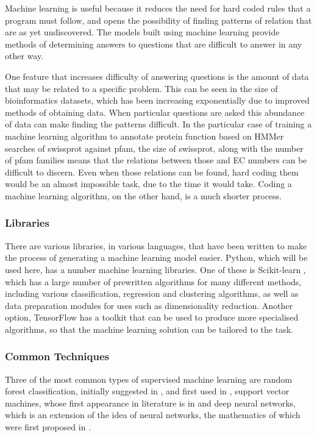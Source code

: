 \documentclass[12pt]{report}
\begin{document}
			Machine learning is useful because it reduces the need for hard coded rules that a program must follow, and opens the possibility of finding patterns of relation that are as yet undiscovered.  The models built using machine learning provide methods of determining answers to questions that are difficult to answer in any other way.  
		
			One feature that increases difficulty of answering questions is the amount of data that may be related to a specific problem.  This can be seen in the size of bioinformatics datasets, which has been increasing exponentially due to improved methods of obtaining data.  When particular questions are asked this abundance of data can make finding the patterns difficult.  In the particular case of training a machine learning algorithm to annotate protein function based on HMMer searches of swissprot against pfam, the size of swissprot, along with the number of pfam families means that the relations between those and EC numbers can be difficult to discern.  Even when those relations can be found, hard coding them would be an almost impossible task, due to the time it would take.  Coding a machine learning algorithm, on the other hand, is a much shorter process.
			
			\subsubsection{Libraries}			
			
				There are various libraries, in various languages, that have been written to make the process of generating a machine learning model easier.  Python, which will be used here, has a number machine learning libraries.  One of these is Scikit-learn \citep{RefWorks:doc:5d80f150e4b07f40b9eab2f8}, which has a large number of prewritten algorithms for many different methods, including various classification, regression and clustering algorithms, as well as data preparation modules for uses such as dimensionality reduction.  Another option, TensorFlow \citep{RefWorks:doc:5d80f20de4b08a779635c81d} has a toolkit that can be used to produce more specialised algorithms, so that the machine learning solution can be tailored to the task.
				
			\subsubsection{Common Techniques}

				Three of the most common types of supervised machine learning are random forest classification, initially suggested in \cite{RefWorks:doc:5d84b84de4b03ee47d60013e}, and first used in \cite{RefWorks:doc:5d84b954e4b01cdccc094821}, support vector machines, whose first appearance in literature is in \cite{RefWorks:doc:5d84bca0e4b074abc390dc95} and deep neural networks, which is an extension of the idea of neural networks, the mathematics of which were first proposed in \cite{RefWorks:doc:5d84d2d4e4b048bf85a1aa0a}.  
\end{document}
